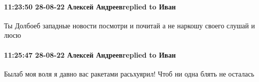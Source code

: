  
 
 
 
 

\paragraph{11:23:50 28-08-22 Алексей Андреевreplied to Иван}

Ты Долбоеб западные новости посмотри и почитай а не наркошу своего слушай и
люсю

\paragraph{11:25:47 28-08-22 Алексей Андреевreplied to Иван}

Былаб моя воля я давно вас ракетами расьхуярил! Чтоб ни одна блять не осталась
